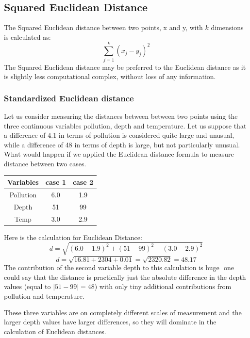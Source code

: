 \documentclass[12pt]{article}
\begin{document}
\subsection{Squared Euclidean Distance}
The Squared Euclidean distance between two points, x and y, with $k$ dimensions is calculated as:
\[ \sum^{k}_{j=1} ( x_j - y_j)^2  \]
The Squared Euclidean distance may be preferred to the Euclidean distance as it is slightly less computational complex, without loss of any information.

\newpage
\subsubsection{{\large Standardized Euclidean distance}}

Let us consider measuring the distances between between two points using
the three continuous variables pollution, depth and temperature. Let us suppose that a difference of 4.1 in terms of pollution is considered quite large and unusual, while a difference of 48 in terms of depth is large, but not particularly unusual.
What would happen if we applied the Euclidean distance formula to measure distance between two cases.
\begin{center}
	\begin{tabular}{|c|c|c|}
		\hline
		Variables & case 1 & case 2 \\ \hline 
		Pollution & 6.0 & 1.9 \\
		Depth & 51 & 99 \\
		Temp & 3.0 & 2.9 \\
		\hline
	\end{tabular}
\end{center}

\noindent Here is the calculation for Euclidean Distance:
\[ d = \sqrt{(6.0 - 1.9)^2 + (51 - 99)^2 + (3.0 - 2.9)^2}   \]
\[ d = \sqrt{16.81 + 2304 + 0.01} = \sqrt{2320.82} = 48.17 \]
\noindent The contribution of the second variable depth to this calculation is huge  one could say
that the distance is practically just the absolute difference in the depth values (equal to
$|51-99| = 48$) with only tiny additional contributions from pollution and temperature. 


These three variables are on
completely different scales of measurement and the larger depth values have larger differences, so they will dominate in the calculation of Euclidean distances.
\newpage
\end{document}
